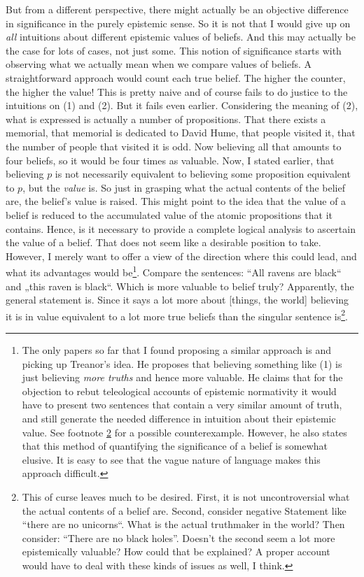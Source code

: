 \documentclass[12pt,numbers=noenddot]{scrartcl}
\begin{document}
But from a different perspective, there might actually be an objective difference in significance in the purely epistemic sense. So it is not that I would give up on \emph{all} intuitions about different epistemic values of beliefs. And this may actually be the case for lots of cases, not just some. This notion of significance starts with observing what we actually mean when we compare values of beliefs. A straightforward approach would count each true belief. The higher the counter, the higher the value! This is pretty naive and of course fails to do justice to the intuitions on (1) and (2). But it fails even earlier. Considering the meaning of (2), what is expressed is actually a number of propositions. That there exists a memorial, that memorial is dedicated to David Hume, that people visited it, that the number of people that visited it is odd. Now believing all that amounts to four beliefs, so it would be four times as valuable. Now, I stated earlier, that believing $p$ is not necessarily equivalent to believing some proposition equivalent to $p$, but the \emph{value} is. So just in grasping what the actual contents of the belief are, the belief's value is raised. This might point to the idea that the value of a belief is reduced to the accumulated value of the atomic propositions that it contains. Hence, is it necessary to provide a complete logical analysis to ascertain the value of a belief. That does not seem like a desirable position to take. However, I merely want to offer a view of the direction where this could lead, and what its advantages would be\footnote{The only papers so far that I found proposing a similar approach is \textcite{Treanor2014-TRETTA} and \textcite{Pritchard2014} picking up Treanor's idea. He proposes that believing something like (1) is just believing \emph{more truths} and hence more valuable. He claims that for the objection to rebut teleological accounts of epistemic normativity it would have to present two sentences that contain a very similar amount of truth, and still generate the needed difference in intuition about their epistemic value. See footnote \ref{foot:noblackholes} for a possible counterexample. However, he also states that this method of quantifying the significance of a belief is somewhat elusive. It is easy to see that the vague nature of language makes this approach difficult.}.
Compare the sentences: “All ravens are black“ and „this raven is black“. Which is more valuable to belief truly? Apparently, the general statement is. Since it says a lot more about [things, the world] believing it  is in value equivalent to a lot more true beliefs than the singular sentence is\footnote{\label{foot:noblackholes}This of curse leaves much to be desired. First, it is not uncontroversial what the actual contents of a belief are. Second, consider negative Statement like “there are no unicorns“. What is the actual truthmaker in the world? Then consider: “There are no black holes”. Doesn't the second seem a lot more epistemically valuable? How could that be explained? A proper account would have to deal with these kinds of issues as well, I think.}.
\end{document}

